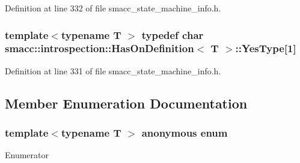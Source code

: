 Definition at line 332 of file smacc\+\_\+state\+\_\+machine\+\_\+info.\+h.

\subsubsection[{\texorpdfstring{Yes\+Type}{YesType}}]{\setlength{\rightskip}{0pt plus 5cm}template$<$typename T $>$ typedef char {\bf smacc\+::introspection\+::\+Has\+On\+Definition}$<$ T $>$\+::Yes\+Type\mbox{[}1\mbox{]}\hspace{0.3cm}{\ttfamily [private]}}\hypertarget{classsmacc_1_1introspection_1_1HasOnDefinition_ad18cda8f47c5a0e9660b7c7ca54d98c7}{}\label{classsmacc_1_1introspection_1_1HasOnDefinition_ad18cda8f47c5a0e9660b7c7ca54d98c7}


Definition at line 331 of file smacc\+\_\+state\+\_\+machine\+\_\+info.\+h.



\subsection{Member Enumeration Documentation}
\subsubsection[{\texorpdfstring{anonymous enum}{anonymous enum}}]{\setlength{\rightskip}{0pt plus 5cm}template$<$typename T $>$ anonymous enum}\hypertarget{classsmacc_1_1introspection_1_1HasOnDefinition_ab40a368fd2564562bf0107984f5f197d}{}\label{classsmacc_1_1introspection_1_1HasOnDefinition_ab40a368fd2564562bf0107984f5f197d}
\begin{Desc}
\item[Enumerator]\par
\begin{description}
\item[{\em 
value\hypertarget{classsmacc_1_1introspection_1_1HasOnDefinition_ab40a368fd2564562bf0107984f5f197da2c667ca4893ef31062bc9864e4d06ab2}{}\label{classsmacc_1_1introspection_1_1HasOnDefinition_ab40a368fd2564562bf0107984f5f197da2c667ca4893ef31062bc9864e4d06ab2}
}]\end{description}
\end{Desc}


